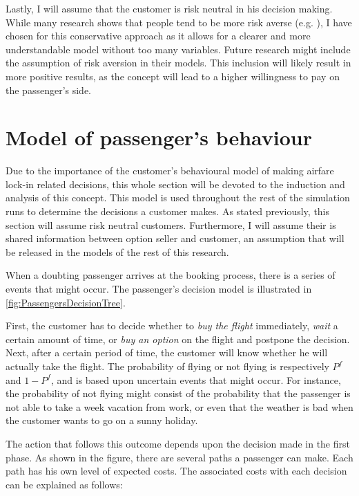 Lastly, I will assume that the customer is risk neutral in his decision making. While many research shows that people tend to be more risk averse (e.g. ), I have chosen for this conservative approach as it allows for a clearer and more understandable model without too many variables. Future research might include the assumption of risk aversion in their models. This inclusion will likely result in more positive results, as the concept will lead to a higher willingness to pay on the passenger's side.


\section{Model of passenger's behaviour}
\label{sec:ModelPassengerBehaviour}
Due to the importance of the customer's behavioural model of making airfare lock-in related decisions, this whole section will be devoted to the induction and analysis of this concept. This model is used throughout the rest of the simulation runs to determine the decisions a customer makes. As stated previously, this section will assume risk neutral customers. Furthermore, I will assume their is shared information between option seller and customer, an assumption that will be released in the models of the rest of this research.

When a doubting passenger arrives at the booking process, there is a series of events that might occur. The passenger's decision model is illustrated in \autoref{fig:PassengersDecisionTree}.


First, the customer has to decide whether to \emph{buy the flight} immediately, \emph{wait} a certain amount of time, or \emph{buy an option} on the flight and postpone the decision. Next, after a certain period of time, the customer will know whether he will actually take the flight. The probability of flying or not flying is respectively $P^f$ and $1 - P^f$, and is based upon uncertain events that might occur. For instance, the probability of not flying might consist of the probability that the passenger is not able to take a week vacation from work, or even that the weather is bad when the customer wants to go on a sunny holiday.

The action that follows this outcome depends upon the decision made in the first phase. As shown in the figure, there are several paths a passenger can make. Each path has his own level of expected costs. The associated costs with each decision can be explained as follows:

